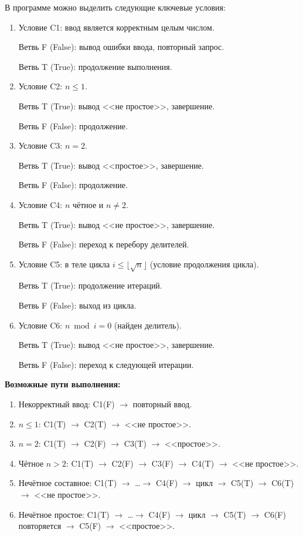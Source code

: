 \documentclass{article}[14pt]
\begin{document}
В программе можно выделить следующие ключевые условия:

\begin{enumerate}
    \item Условие C1: ввод является корректным целым числом.

        Ветвь F (False): вывод ошибки ввода, повторный запрос.

        Ветвь T (True): продолжение выполнения.

    \item Условие C2: $n \leq 1$.

        Ветвь T (True): вывод <<не простое>>, завершение.

        Ветвь F (False): продолжение.

    \item Условие C3: $n = 2$.

        Ветвь T (True): вывод <<простое>>, завершение.

        Ветвь F (False): продолжение.

    \item Условие C4: $n$ чётное и $n \neq 2$.

        Ветвь T (True): вывод <<не простое>>, завершение.

        Ветвь F (False): переход к перебору делителей.

    \item Условие C5: в теле цикла $i \leq \lfloor\sqrt{n}\rfloor$ (условие продолжения цикла).

        Ветвь T (True): продолжение итераций.

        Ветвь F (False): выход из цикла.

    \item Условие C6: $n \bmod i = 0$ (найден делитель).

        Ветвь T (True): вывод <<не простое>>, завершение.

        Ветвь F (False): переход к следующей итерации.
\end{enumerate}

\noindent \textbf{Возможные пути выполнения:}

\begin{enumerate}
    \item Некорректный ввод: C1(F) $\to$ повторный ввод.
    \item $n \leq 1$: C1(T) $\to$ C2(T) $\to$ <<не простое>>.
    \item $n = 2$: C1(T) $\to$ C2(F) $\to$ C3(T) $\to$ <<простое>>.
    \item Чётное $n > 2$: C1(T) $\to$ C2(F) $\to$ C3(F) $\to$ C4(T) $\to$ <<не простое>>.
    \item Нечётное составное: C1(T) $\to$ \ldots $\to$ C4(F) $\to$ цикл $\to$ C5(T) $\to$ C6(T) $\to$ <<не простое>>.
    \item Нечётное простое: C1(T) $\to$ \ldots $\to$ C4(F) $\to$ цикл $\to$ C5(T) $\to$ C6(F) повторяется $\to$ C5(F) $\to$ <<простое>>.
\end{enumerate}
\end{document}

